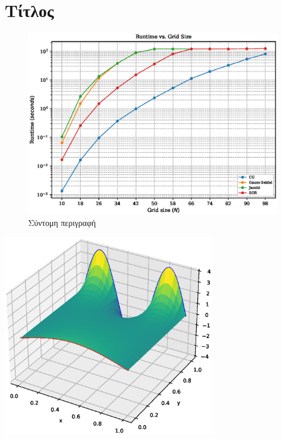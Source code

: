\section{Τίτλος}

\begin{figure}[h!]
    \centering
    \includegraphics[width=0.80\linewidth]{doc/figures/runtime_gridsize.eps}
    \caption{Σύντομη περιγραφή}
    \label{fig:placeholder}
\end{figure}

\begin{image}
    \centering
    \includegraphics[width=0.70\textwidth]{doc/images/surface_plot.eps}
    \caption{Σύντομη περιγραφή}
    \label{img:example}
\end{image}


